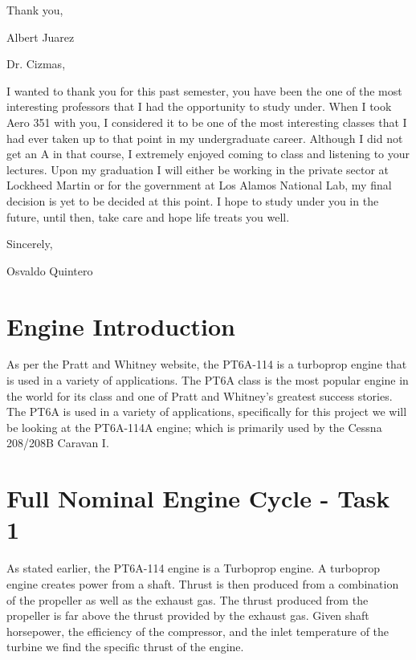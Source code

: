 \documentclass[titlepage]{article}
\begin{document}
    \vspace{0.5cm}
    Thank you,

    Albert Juarez

    \vspace{1cm}


    Dr. Cizmas, 
    \vspace{0.5cm}

    I wanted to thank you for this past semester, you have been the one of the most interesting professors that I had the opportunity to study under. When I took Aero 351 with you, I considered it to be one of the most interesting classes that I had ever taken up to that point in my undergraduate career. Although I did not get an A in that course, I extremely enjoyed coming to class and listening to your lectures. Upon my graduation I will either be working in the private sector at Lockheed Martin or for the government at Los Alamos National Lab, my final decision is yet to be decided at this point. I hope to study under you in the future, until then, take care and hope life treats you well.

    \vspace{0.5cm}

    Sincerely,

    Osvaldo Quintero

    \vspace{5cm}

    \section{Engine Introduction}

    As per the Pratt and Whitney website, the PT6A-114 is a turboprop engine that is used in a variety of applications. 
    The PT6A class is the most popular engine in the world for its class and one of Pratt and Whitney's greatest success stories.
    The PT6A is used in a variety of applications, specifically for this project we will be looking at the PT6A-114A engine; which is 
    primarily used by the Cessna 208/208B Caravan I. 

    \section{Full Nominal Engine Cycle - Task 1}

    As stated earlier, the PT6A-114 engine is a Turboprop engine.
    A turboprop engine creates power from a shaft. Thrust is then produced from a combination of the propeller as well as the exhaust gas. The thrust produced from the propeller is far above the thrust provided by the exhaust gas. Given shaft horsepower, the efficiency of the compressor, and the inlet temperature of the turbine we find the specific thrust of the engine.
\end{document}
